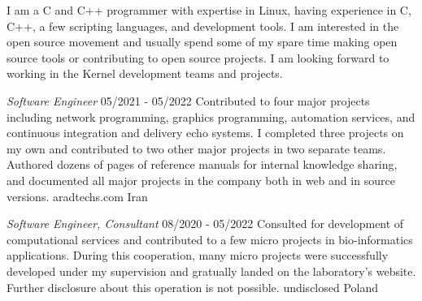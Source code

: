 \documentclass[a4paper,12pt]{memoir} %
\begin{document}
\userinformation %

\framebreak %


\CVDate




{I am a C and C++ programmer with expertise in Linux, having experience in C, C++, a few scripting languages, and development tools. I am interested in the open source movement and usually spend some of my spare time making open source tools or contributing to open source projects. I am looking forward to working in the Kernel development teams and projects.}


\SmallSep %




{\textit{Software Engineer}}
{05/2021 - 05/2022}
{Contributed to four major projects including
network programming, graphics programming,
automation services, and continuous integration
and delivery echo systems.
I completed three projects on my own and
contributed to two other major projects
in two separate teams.
Authored dozens of pages of reference manuals
for internal knowledge sharing, and documented
all major projects in the company both in web and 
in source versions.}
{aradtechs.com}
{Iran}


{\textit{Software Engineer, Consultant}}
{08/2020 - 05/2022}
{Consulted for development of computational
services and contributed to a few micro projects
in bio-informatics applications.
During this cooperation, many micro projects were
successfully developed under my supervision and
gratually landed on the laboratory's website.
Further disclosure about this operation is not possible.}
{undisclosed}
{Poland}
\end{document}
